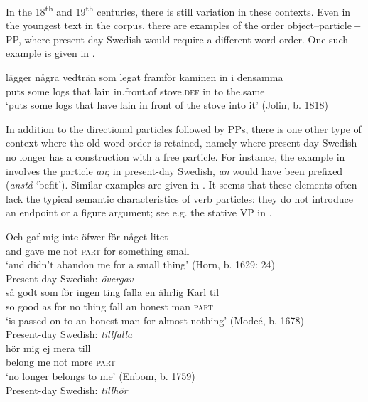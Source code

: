\documentclass[output=paper]{langscibook}
\begin{document}
\begin{sloppypar}
In the 18\textsuperscript{th} and 19\textsuperscript{th} centuries, there is still variation in these contexts. Even in the youngest text in the corpus, there are examples of the order object–particle\,+\,PP, where present-day Swedish would require a different word order. One such example is given in .
\end{sloppypar}

\ea\label{ex:lalu:44}
\gll  lägger   några   vedträn   som   legat   framför       kaminen in       i     densamma\\
puts       some     logs     that     lain     in.front.of   stove.\textsc{def} in   to   the.same\\
\glt `puts some logs that have lain in front of the stove into it’ (Jolin, b. 1818)\\
\z


In addition to the directional particles followed by PPs, there is one other type of context where the old word order is retained, namely where present-day Swedish no longer has a construction with a free particle. For instance, the example in  involves the particle \textit{an}; in present-day Swedish, \textit{an} would have been prefixed (\textit{anstå} ‘befit’). Similar examples are given in . It seems that these elements often lack the typical semantic characteristics of verb particles: they do not introduce an endpoint or a figure argument; see e.g. the stative VP in .


\ea\label{ex:lalu:45}
\ea\label{ex:lalu:45a}
\gll  Och   gaf   mig     inte     öfwer   för     någet       litet\\
    and     gave  me   not   \textsc{part}     for     something   small\\
\glt `and didn’t abandon me for a small thing’ (Horn, b. 1629: 24)\\
    Present-day Swedish: \textit{övergav}\\

\ex\label{ex:lalu:45b}
\gll  så    godt   som   för   ingen ting   falla   en  ährlig   Karl   til \\
    so     good   as     for   no thing     fall   an  honest   man   \textsc{part}\\
\glt ‘is passed on to an honest man for almost nothing’ (Modeé, b. 1678)\\
    Present-day Swedish: \textit{tillfalla} \\
\ex\label{ex:lalu:45c}
\gll hör       mig   ej     mera   till \\
    belong   me   not   more   \textsc{part}\\
\glt `no longer belongs to me’ (Enbom, b. 1759)\\
    Present-day Swedish: \textit{tillhör}\\
\z
\z
\end{document}
